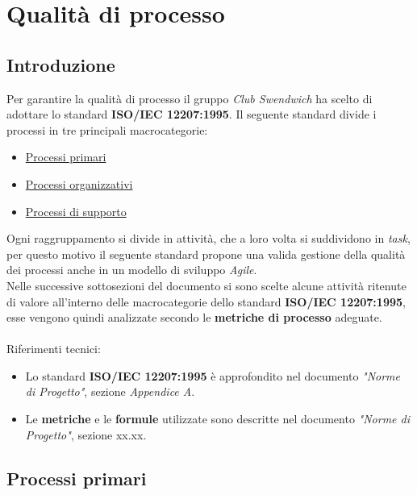 \section{Qualità di processo}
\subsection{Introduzione}
Per garantire la qualità di processo il gruppo \textit{Club Swendwich} 
ha scelto di adottare lo standard \textbf{ISO/IEC 12207:1995}.
Il seguente standard divide i processi in tre principali macrocategorie:
\begin{itemize}
    \item \hyperref[sec:PCP]{Processi primari}
    \item \hyperref[sec:PCO]{Processi organizzativi}
    \item \hyperref[sec:PCS]{Processi di supporto}
\end{itemize}
Ogni raggruppamento si divide in attività, che a loro volta si suddividono
in \textit{task}, per questo motivo il seguente standard propone una valida gestione della
qualità dei processi anche in un modello di sviluppo \textit{Agile}.\\
\noindent
Nelle successive sottosezioni del documento si sono scelte alcune attività ritenute di valore all'interno
delle macrocategorie dello standard \textbf{ISO/IEC 12207:1995}, esse vengono quindi analizzate
secondo le \textbf{metriche di processo} adeguate.\\
\\
\noindent
Riferimenti tecnici:
\begin{itemize}
    \item Lo standard \textbf{ISO/IEC 12207:1995} è approfondito nel documento \textit{"Norme di Progetto"},
    sezione \textit{Appendice A}.
    \item Le \textbf{metriche} e le \textbf{formule} utilizzate sono descritte nel documento \textit{"Norme di Progetto"},
    sezione xx.xx.
\end{itemize}

\bigskip

\subsection{Processi primari}
\label{sec:PCP}

